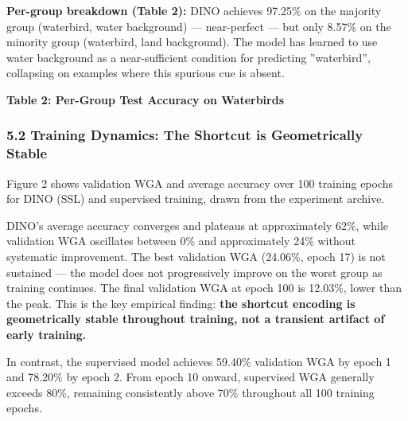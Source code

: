 \textbf{Per-group breakdown (Table 2):} DINO achieves 97.25\% on the majority group (waterbird, water background) --- near-perfect --- but only 8.57\% on the minority group (waterbird, land background). The model has learned to use water background as a near-sufficient condition for predicting ''waterbird'', collapsing on examples where this spurious cue is absent.

\textbf{Table 2: Per-Group Test Accuracy on Waterbirds}

\begin{table}[htbp]
\centering
{}
\end{table}

\subsubsection{5.2 Training Dynamics: The Shortcut is Geometrically Stable}

Figure 2 shows validation WGA and average accuracy over 100 training epochs for DINO (SSL) and supervised training, drawn from the experiment archive.

DINO's average accuracy converges and plateaus at approximately 62\%, while validation WGA oscillates between 0\% and approximately 24\% without systematic improvement. The best validation WGA (24.06\%, epoch 17) is not sustained --- the model does not progressively improve on the worst group as training continues. The final validation WGA at epoch 100 is 12.03\%, lower than the peak. This is the key empirical finding: \textbf{the shortcut encoding is geometrically stable throughout training, not a transient artifact of early training.}

In contrast, the supervised model achieves 59.40\% validation WGA by epoch 1 and 78.20\% by epoch 2. From epoch 10 onward, supervised WGA generally exceeds 80\%, remaining consistently above 70\% throughout all 100 training epochs.

